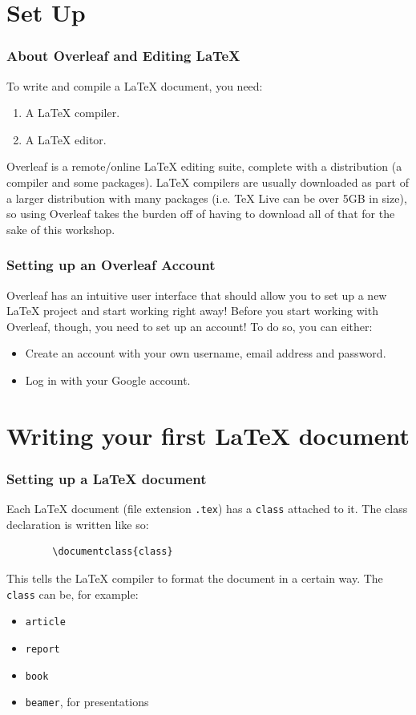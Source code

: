 \documentclass{beamer}
\newcommand{\biggap}{\newline{}\newline{}}
\begin{document}
	\section{Set Up}
	
	\begin{frame}
		\frametitle{About Overleaf and Editing \LaTeX{}}
		To write and compile a \LaTeX{} document, you need: \pause
		\begin{enumerate}
			\item A \LaTeX{} compiler.\pause
			\item A \LaTeX{} editor.
		\end{enumerate}
		\pause
		Overleaf is a remote/online \LaTeX{} editing suite, complete with a distribution (a compiler and some packages). \pause \LaTeX{} compilers are usually downloaded as part of a larger distribution with many packages (i.e. \TeX{} Live can be over 5GB in size), so using Overleaf takes the burden off of having to download all of that for the sake of this workshop.
	\end{frame}
	
	\begin{frame}
		\frametitle{Setting up an Overleaf Account}
		Overleaf has an intuitive user interface that should allow you to set up a new LaTeX project and start working right away!\pause\biggap
		Before you start working with Overleaf, though, you need to set up an account! \pause\biggap
		To do so, you can either:
		\begin{itemize}
			\item Create an account with your own username, email address and password.\pause
			\item Log in with your Google account.
		\end{itemize}
	\end{frame}
	
	\section{Writing your first \LaTeX{} document}
	
	\begin{frame}[fragile]
		\frametitle{Setting up a \LaTeX{} document}
		Each \LaTeX{} document (file extension \verb|.tex|) has a \verb|class| attached to it.
		The class declaration is written like so:
		\begin{lstlisting}
		\documentclass{class}
		\end{lstlisting}
		This tells the \LaTeX{} compiler to format the document in a certain way.\pause\biggap
		The \verb|class| can be, for example: \pause
		\begin{itemize}
			\item \verb|article| \pause
			\item \verb|report| \pause
			\item \verb|book| \pause
			\item \verb|beamer|, for presentations
		\end{itemize}
	\end{frame}
	
\end{document}

